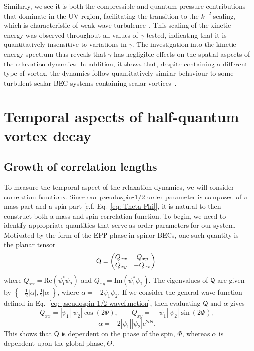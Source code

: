 Similarly, we see it is both the compressible and quantum pressure contributions
that dominate in the UV region, facilitating the transition to the \(k^{-2}\)
scaling, which is characteristic of weak-wave-turbulence~\cite{Zakharov1992,
Nazarenko2011, Newell2011}.
This scaling of the kinetic energy was observed throughout all values of
\(\gamma \) tested, indicating that it is quantitatively insensitive to
variations in \(\gamma \).
The investigation into the kinetic energy spectrum thus reveals that \(\gamma \)
has negligible effects on the spatial aspects of the relaxation dynamics.
In addition, it shows that, despite containing a different type of vortex, the
dynamics follow quantitatively similar behaviour to some turbulent scalar BEC
systems containing scalar vortices~\cite{Nowak2012}.

\section{Temporal aspects of half-quantum vortex decay}
\subsection{Growth of correlation lengths}
To measure the temporal aspect of the relaxation dynamics, we will consider
correlation functions.
Since our pseudospin-1/2 order parameter is composed of a mass part and a spin
part [c.f. Eq.~\eqref{eq: Theta-Phi}], it is natural to then construct both a
mass and spin correlation function.
To begin, we need to identify appropriate quantities that serve as order
parameters for our system.
Motivated by the form of the EPP phase in spinor BECs, one such quantity is
the planar tensor~\cite{Symes2017}
\begin{equation}
    \mathsf{Q} = \mqty(Q_{xx} & Q_{xy} \\ Q_{xy} & -Q_{xx}),
\end{equation}
where \(Q_{xx} = \mathrm{Re}(\psi_1^*\psi_2)\) and
\(Q_{xy} = \mathrm{Im}(\psi_1^*\psi_2)\).
The eigenvalues of \(\mathsf{Q}\) are given by
\( \left\{-\frac{1}{2}|\alpha|, \frac{1}{2}|\alpha|\right\} \), where
\(\alpha=-2\psi_1\psi_2\).
If we consider the general wave function defined in
Eq.~\eqref{eq: pseudospin-1/2-wavefunction}, then evaluating \(\mathsf{Q}\) and
\(\alpha \) gives
\begin{equation}
    Q_{xx} = |\psi_1||\psi_2|\cos({2\Phi}), \qquad
    Q_{xy} = -|\psi_1||\psi_2|\sin({2\Phi}),
\end{equation}
\begin{equation}
    \alpha = -2|\psi_1||\psi_2|e^{2i\Theta}.
\end{equation}
This shows that \(\mathsf{Q}\) is dependent on the phase of the spin,
\( \Phi \), whereas \(\alpha \) is dependent upon the global phase,
\( \Theta \).

